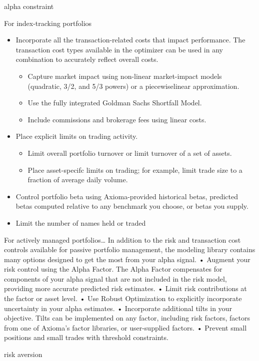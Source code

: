 \documentclass[presentation]{beamer}
\begin{document}
\begin{frame}[label={sec:orgheadline8}]{alpha constraint}
\begin{block}{For index-tracking portfolios}
\begin{itemize}
\begin{itemize}
\item Include risk elements that use more than one benchmark or model portfolio.
\end{itemize}
\item Incorporate all the transaction-related costs that impact performance. The transaction cost types available in the optimizer can be used in any combination to accurately reﬂect overall costs.
\begin{itemize}
\item Capture market impact using non-linear market-impact models (quadratic, 3/2, and 5/3 powers) or a piecewiselinear approximation.
\item Use the fully integrated Goldman Sachs Shortfall Model.
\item Include commissions and brokerage fees using linear costs.
\end{itemize}
\item Place explicit limits on trading activity.
\begin{itemize}
\item Limit overall portfolio turnover or limit turnover of a set of assets.
\item Place asset-specifc limits on trading; for example, limit trade size to a fraction of average daily volume.
\end{itemize}
\item Control portfolio beta using Axioma-provided historical betas, predicted betas computed relative to any benchmark you choose, or betas you supply.
\item Limit the number of names held or traded
\end{itemize}
\end{block}
\begin{block}{For actively managed portfolios…}
In addition to the risk and transaction cost controls available for passive portfolio management, the modeling library contains many options designed to get the most from your alpha signal.
• Augment your risk control using the Alpha Factor. The Alpha Factor compensates for components of your alpha signal that are not included in the risk model, providing more accurate predicted risk estimates.
• Limit risk contributions at the factor or asset level.
• Use Robust Optimization to explicitly incorporate uncertainty in your alpha estimates.
• Incorporate additional tilts in your objective. Tilts can be implemented on any factor, including risk factors, factors from one of Axioma’s factor libraries, or user-supplied factors.
• Prevent small positions and small trades with threshold constraints.
\end{block}
\end{frame}
\begin{frame}[label={sec:orgheadline9}]{risk aversion}
\end{frame}
\end{document}
